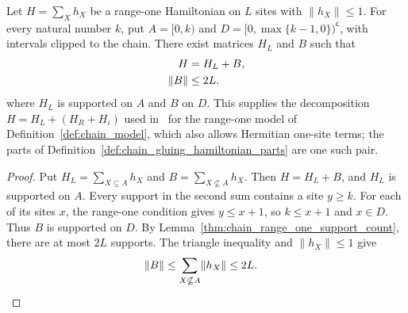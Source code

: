 \begin{lemma}
    \label{thm:chain_gluing_hamiltonian_decomposition}
    \leanok
    Let $H=\sum_Xh_X$ be a range-one Hamiltonian on $L$ sites with
    $\lVert h_X\rVert\le1$. For every natural number $k$, put
    $A=\lbrack0,k)$ and $D=\lbrack0,\max\{k-1,0\})^{\mathsf c}$, with intervals clipped
    to the chain. There exist matrices $H_L$ and $B$ such that
    \begin{align}
        H              & =H_L+B,\notag \\
        \lVert B\rVert & \le2L.\notag
    \end{align}
    where $H_L$ is supported on $A$ and $B$ on $D$.
    This supplies the decomposition $H=H_L+(H_R+H_i)$ used
    in~\cite[lines 409--410]{Landau2015Polynomial} for the range-one model
    of Definition~\ref{def:chain_model}, which also allows Hermitian one-site terms;
    the parts of Definition~\ref{def:chain_gluing_hamiltonian_parts} are one such pair.
\end{lemma}
\begin{proof}\leanok
    Put $H_L=\sum_{X\subseteq A}h_X$ and
    $B=\sum_{X\nsubseteq A}h_X$. Then $H=H_L+B$, and $H_L$ is
    supported on $A$. Every support in the second sum contains a site
    $y\ge k$. For each of its sites $x$, the range-one condition gives
    $y\le x+1$, so $k\le x+1$ and $x\in D$. Thus $B$ is supported on $D$.
    By Lemma~\ref{thm:chain_range_one_support_count}, there are at most
    $2L$ supports. The triangle inequality and $\lVert h_X\rVert\le1$ give
    \begin{align}
        \lVert B\rVert & \le\sum_{X\nsubseteq A}\lVert h_X\rVert\le2L.\notag
    \end{align}
\end{proof}


